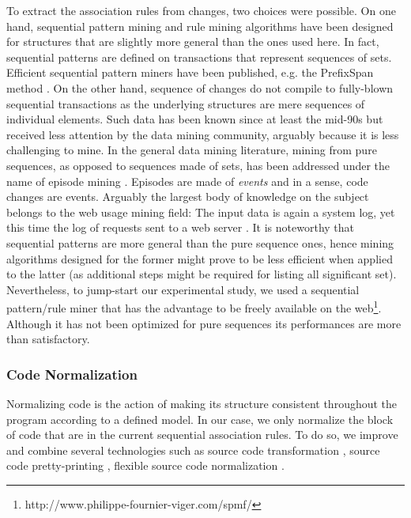 To extract the association rules from changes,
two choices were possible. On one hand, sequential pattern mining and rule mining algorithms
have been designed for structures that are slightly more general than the ones used here.
In fact, sequential patterns are defined on transactions that represent sequences of sets.
Efficient sequential pattern miners have been published, e.g. the PrefixSpan method \cite{Pei2004}.
On the other hand, sequence of changes do not compile to fully-blown sequential transactions as the underlying structures are mere sequences of individual elements. Such data has been known since at least the mid-90s but received less attention by the data mining community, arguably because it is less challenging to mine.
In the general data mining literature, mining from pure sequences, as opposed to sequences made of sets, has been addressed under the name of episode mining \cite{HEIKKI1997}.
Episodes are made of \textit{events} and in a sense, code changes are events. Arguably the largest body of knowledge on the subject belongs to the web usage mining field: The input data is again a system log, yet this time the log of requests sent to a web server \cite{Pei2000}.
It is noteworthy that sequential patterns are more general than the pure sequence ones, hence mining algorithms designed for the former might prove to be less efficient when applied to the latter (as additional steps might be required for listing all significant set).
Nevertheless, to jump-start our experimental study, we used a sequential pattern/rule miner that has the advantage to be freely available on the web\footnote{http://www.philippe-fournier-viger.com/spmf/}.
Although it has not been optimized for pure sequences its performances are more than satisfactory.

\subsubsection{Code Normalization\label{sec:resemble-normalization}}

Normalizing code is the action of making its structure consistent throughout the program according to a defined model. In our case, we only normalize the block of code that are in the current sequential association rules. To do so, we improve and combine several technologies such as source code transformation \cite{Cordy2006,Cordy2006a}, source code pretty-printing \cite{Roy2008}, flexible source code normalization \cite{Cordy2011}.

